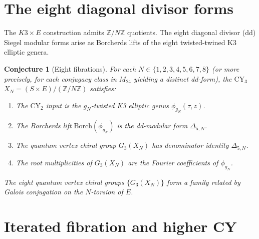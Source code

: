 \documentclass[11pt]{article}
\theoremstyle{plain}
\newtheorem{conjecture}[theorem]{Conjecture}
\theoremstyle{definition}
\theoremstyle{remark}
\newcommand{\CY}{\mathrm{CY}}
\begin{document}
\section{The eight diagonal divisor forms}
\label{sec:fib-eight}

The $K3 \times E$ construction admits $\mathbb{Z}/N\mathbb{Z}$ quotients. The
eight diagonal divisor (dd) Siegel modular forms arise as Borcherds lifts of
the eight twisted-twined K3 elliptic genera.

\begin{conjecture}[Eight fibrations]
\label{conj:eight-fibrations}
For each $N \in \{1, 2, 3, 4, 5, 6, 7, 8\}$ (or more precisely, for each
conjugacy class in $M_{24}$ yielding a distinct dd-form), the $\CY_3$
$X_N = (S \times E)/(\mathbb{Z}/N\mathbb{Z})$ satisfies:
\begin{enumerate}[label=(\roman*)]
\item The $\CY_2$ input is the $g_N$-twisted K3 elliptic genus
 $\phi_{g_N}(\tau, z)$.

\item The Borcherds lift $\mathrm{Borch}(\phi_{g_N})$ is the dd-modular form
 $\Delta_{5,N}$.

\item The quantum vertex chiral group $G_3(X_N)$ has denominator identity
 $\Delta_{5,N}$.

\item The root multiplicities of $G_3(X_N)$ are the Fourier coefficients of
 $\phi_{g_N}$.
\end{enumerate}
The eight quantum vertex chiral groups $\{G_3(X_N)\}$ form a family related by
Galois conjugation on the $N$-torsion of $E$.
\end{conjecture}

\section{Iterated fibration and higher CY}
\label{sec:fib-iterated}
\end{document}
